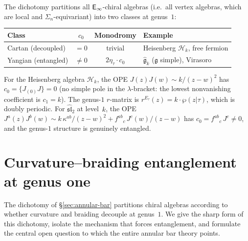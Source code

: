 \begin{remark}
\label{rem:annular-pole-classification}
The dichotomy partitions all $\mathsf{E}_{\infty}$-chiral algebras
(i.e.\ all vertex algebras, which are local and
$\Sigma_n$-equivariant) into two classes at genus~$1$:
\begin{center}
\begin{tabular}{l@{\quad}c@{\quad}c@{\quad}l}
\toprule
\textbf{Class} & $c_0$ & \textbf{Monodromy} & \textbf{Example} \\
\midrule
Cartan (decoupled) & $=0$ & trivial &
 Heisenberg $\mathcal{H}_k$, free fermion \\
Yangian (entangled) & $\ne 0$ & $2\eta_\tau\cdot c_0$ &
 $\widehat{\mathfrak{g}}_k$ ($\mathfrak{g}$ simple),
 Virasoro \\
\bottomrule
\end{tabular}
\end{center}
For the Heisenberg algebra $\mathcal{H}_k$, the OPE
$J(z)J(w)\sim k/(z-w)^2$ has $c_0=\{J{}_{(0)}J\}=0$ (no
simple pole in the $\lambda$-bracket: the lowest nonvanishing
coefficient is $c_1=k$). The genus-$1$ $r$-matrix is
$r^{E_\tau}(z)=k\cdot\wp(z|\tau)$, which is doubly periodic.
For $\widehat{\mathfrak{sl}}_2$ at level~$k$, the OPE
$J^a(z)J^b(w)\sim k\,\kappa^{ab}/(z-w)^2+f^{ab}{}_c\,J^c(w)/(z-w)$
has $c_0=f^{ab}{}_c\,J^c\ne 0$, and the genus-$1$ structure
is genuinely entangled.
\end{remark}


\section{Curvature--braiding entanglement at genus one}
\label{sec:curvature-braiding-entanglement}

The dichotomy of \S\ref{sec:annular-bar} partitions chiral algebras
according to whether curvature and braiding decouple at genus~$1$.
We give the sharp form of this dichotomy, isolate the mechanism
that forces entanglement, and formulate the central open question
to which the entire annular bar theory points.

